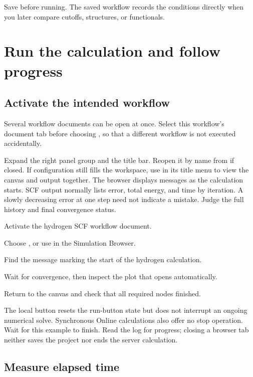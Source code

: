 Save before running. The saved workflow records the conditions directly when you later compare cutoffs, structures, or functionals.

\section{Run the calculation and follow progress}

\subsection{Activate the intended workflow}

Several workflow documents can be open at once. Select this workflow's document tab before choosing , so that a different workflow is not executed accidentally.

Expand the right panel group and the  title bar. Reopen it by name from  if closed. If configuration still fills the workspace, use  in its title menu to view the canvas and output together. The browser displays messages as the calculation starts. SCF output normally lists error, total energy, and time by iteration. A slowly decreasing error at one step need not indicate a mistake. Judge the full history and final convergence status.

\begin{steps}
\item Activate the hydrogen SCF workflow document.
\item Choose , or use  in the Simulation Browser.
\item Find the message marking the start of the hydrogen calculation.
\item Wait for convergence, then inspect the plot that opens automatically.
\item Return to the canvas and check that all required nodes finished.
\end{steps}

The local  button resets the run-button state but does not interrupt an ongoing numerical solve. Synchronous Online calculations also offer no stop operation. Wait for this example to finish. Read the log for progress; closing a browser tab neither saves the project nor ends the server calculation.

\subsection{Measure elapsed time}

